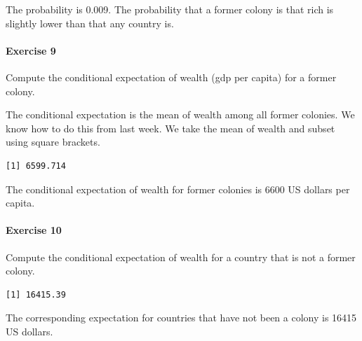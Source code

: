 \documentclass[]{article}
\newenvironment{Shaded}{\begin{snugshade}}{\end{snugshade}}
\newcommand{\KeywordTok}[1]{\textcolor[rgb]{0.13,0.29,0.53}{\textbf{#1}}}
\newcommand{\StringTok}[1]{\textcolor[rgb]{0.31,0.60,0.02}{#1}}
\newcommand{\OperatorTok}[1]{\textcolor[rgb]{0.81,0.36,0.00}{\textbf{#1}}}
\newcommand{\NormalTok}[1]{#1}
\let\oldparagraph\paragraph
\renewcommand{\paragraph}[1]{\oldparagraph{#1}\mbox{}}
\theoremstyle{definition}
\theoremstyle{definition}
\theoremstyle{definition}
\theoremstyle{remark}
\begin{document}
The probability is 0.009. The probability that a former colony is that
rich is slightly lower than that any country is.

\paragraph{Exercise 9}\label{exercise-9-1}

Compute the conditional expectation of wealth (gdp per capita) for a
former colony.

The conditional expectation is the mean of wealth among all former
colonies. We know how to do this from last week. We take the mean of
wealth and subset using square brackets.

\begin{Shaded}
\end{Shaded}

\begin{verbatim}
[1] 6599.714
\end{verbatim}

The conditional expectation of wealth for former colonies is 6600 US
dollars per capita.

\paragraph{Exercise 10}\label{exercise-10-1}

Compute the conditional expectation of wealth for a country that is not
a former colony.

\begin{Shaded}
\end{Shaded}

\begin{verbatim}
[1] 16415.39
\end{verbatim}

The corresponding expectation for countries that have not been a colony
is 16415 US dollars.
\end{document}
